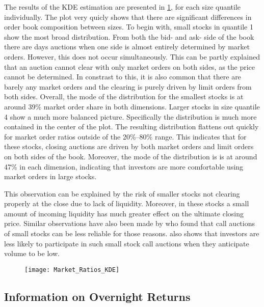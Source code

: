 \documentclass[11pt,a4paper]{article}
\begin{document}
    The results of the \ac{KDE} estimation are presented in \cref{fig:MarketOrdersKDE}, for each size quantile individually. The plot very quicly shows that there are significant differences in order book composition between sizes. To begin with, small stocks in quantile 1 show the most broad distribution. From both the bid- and ask- side of the book there are days auctions when one side is almost entirely determined by market orders. However, this does not occur simultaneously. This can be partly explained that an auction cannot clear with only market orders on both sides, as the price cannot be determined. In constrast to this, it is also common that there are barely any market orders and the clearing is purely driven by limit orders from both sides. Overall, the mode of the distribution for the smallest stocks is at around 39\% market order share in both dimensions.
    Larger stocks in size quantile 4 show a much more balanced picture. Specifically the distribution is much more contained in the center of the plot. The resulting distribution flattens out quickly for market order ratios outside of the 20\%--80\% range. This indicates that for these stocks, closing auctions are driven by both market orders and limit orders on both sides of the book. Moreover, the mode of the distribution is is at around 47\% in each dimension, indicating that investors are more comfortable using market orders in large stocks.

    This observation can be explained by the risk of smaller stocks not clearing properly at the close due to lack of liquidity. Moreover, in these stocks a small amount of incoming liquidity has much greater effect on the ultimate closing price. Similar observations have also been made by \textcite{EllulShinTonks2005,Ibikunle2015} who found that call auctions of small stocks can be less reliable for those reasons. \textcite{EllulShinTonks2005} also shows that investors are less likely to participate in such small stock call auctions when they anticipate volume to be low.

    \begin{figure}[t!]
        \centering
        \texttt{[image: Market\_Ratios\_KDE]}
        \caption{}
        \label{fig:MarketOrdersKDE}
    \end{figure}

    \subsection{Information on Overnight Returns} \label{subsec:ClosingReturns}
\end{document}
